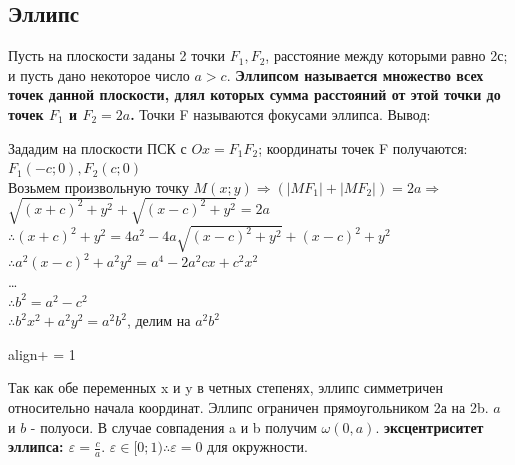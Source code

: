 \documentclass[oneside]{book}
\newcommand{\boxedeq}[2]{\begin{empheq}[box={\fboxsep=6pt\fbox}]{align}\label{#1}#2\end{empheq}}
\begin{document}
\begin{enumerate}
\subsection{Эллипс}
Пусть на плоскости заданы 2 точки $F_1, F_2$, расстояние между которыми равно 2с; и пусть дано
некоторое число $a > c$. \textbf{Эллипсом называется множество всех точек данной плоскости, длял которых
сумма расстояний от этой точки до точек $F_1$ и $F_2 = 2a$.} Точки F называются фокусами эллипса. Вывод:
\begin{center}
        Зададим на плоскости ПСК с $Ox = F_1F_2$; координаты точек F получаются: $F_1(-c; 0), F_2(c; 0)$ \\
        Возьмем произвольную точку $M(x; y) \Rightarrow (|MF_1| + |MF_2|) = 2a \Rightarrow$ \\
        $\sqrt{(x+c)^2 + y^2} + \sqrt{(x-c)^2 + y^2} = 2a$ \\
        $\therefore (x+c)^2 + y^2 = 4a^2 - 4a\sqrt{(x-c)^2 + y^2} + (x-c)^2 + y^2$ \\
        $\therefore a^2(x-c)^2+a^2y^2 = a^4 - 2a^2cx+c^2x^2$ \\
        \dots \\
        $\therefore b^2 = a^2 - c^2$ \\
        $\therefore b^2x^2 + a^2y^2 = a^2b^2$, делим на $a^2b^2$ \\
        \boxedeq{eq:*}{+ = 1}
\end{center}
Так как обе переменных x и y в четных степенях, эллипс симметричен относительно начала координат.
Эллипс ограничен прямоугольником 2а на 2b. $a$ и $b$ - полуоси. В случае совпадения a и b получим $\omega(0, a)$.
\textbf{эксцентриситет эллипса: $\varepsilon = \frac{c}{a}$}. $\varepsilon \in [0; 1) \therefore \varepsilon = 0$ для окружности.


\end{enumerate}
\end{document}
